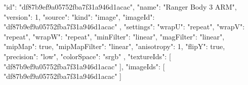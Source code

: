 {
  "id": "df87b9ef9a05752fba7f31a946d1acac",
  "name": "Ranger Body 3 ARM",
  "version": 1,
  "source": {
    "kind": "image",
    "imageId": "df87b9ef9a05752fba7f31a946d1acac"
  },
  "settings": {
    "wrapU": "repeat",
    "wrapV": "repeat",
    "wrapW": "repeat",
    "minFilter": "linear",
    "magFilter": "linear",
    "mipMap": true,
    "mipMapFilter": "linear",
    "anisotropy": 1,
    "flipY": true,
    "precision": "low",
    "colorSpace": "srgb"
  },
  "textureIds": [
    "df87b9ef9a05752fba7f31a946d1acac"
  ],
  "imageIds": [
    "df87b9ef9a05752fba7f31a946d1acac"
  ]
}
